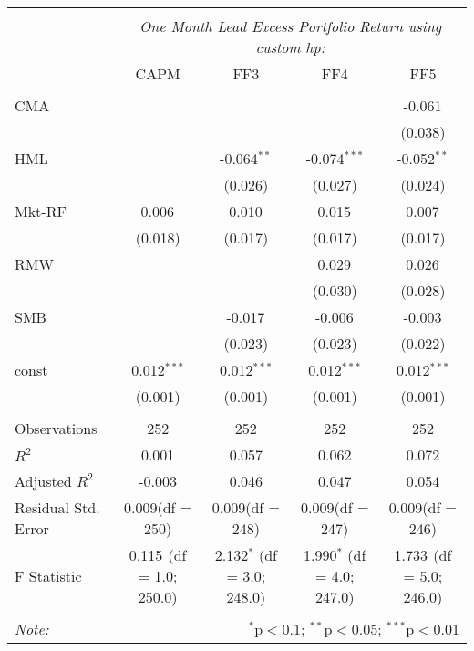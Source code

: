 \begin{table}[!htbp] \centering
\begin{tabular}{@{\extracolsep{5pt}}lcccc}
\\[-1.8ex]\hline
\hline \\[-1.8ex]
& \multicolumn{4}{c}{\textit{One Month Lead Excess Portfolio Return using custom hp:}} \
\cr \cline{4-5}
\\[-1.8ex] & CAPM & FF3 & FF4 & FF5 \\
\hline \\[-1.8ex]
 CMA & & & & -0.061$^{}$ \\
  & & & & (0.038) \\
 HML & & -0.064$^{**}$ & -0.074$^{***}$ & -0.052$^{**}$ \\
  & & (0.026) & (0.027) & (0.024) \\
 Mkt-RF & 0.006$^{}$ & 0.010$^{}$ & 0.015$^{}$ & 0.007$^{}$ \\
  & (0.018) & (0.017) & (0.017) & (0.017) \\
 RMW & & & 0.029$^{}$ & 0.026$^{}$ \\
  & & & (0.030) & (0.028) \\
 SMB & & -0.017$^{}$ & -0.006$^{}$ & -0.003$^{}$ \\
  & & (0.023) & (0.023) & (0.022) \\
 const & 0.012$^{***}$ & 0.012$^{***}$ & 0.012$^{***}$ & 0.012$^{***}$ \\
  & (0.001) & (0.001) & (0.001) & (0.001) \\
\hline \\[-1.8ex]
 Observations & 252 & 252 & 252 & 252 \\
 $R^2$ & 0.001 & 0.057 & 0.062 & 0.072 \\
 Adjusted $R^2$ & -0.003 & 0.046 & 0.047 & 0.054 \\
 Residual Std. Error & 0.009(df = 250) & 0.009(df = 248) & 0.009(df = 247) & 0.009(df = 246)  \\
 F Statistic & 0.115$^{}$ (df = 1.0; 250.0) & 2.132$^{*}$ (df = 3.0; 248.0) & 1.990$^{*}$ (df = 4.0; 247.0) & 1.733$^{}$ (df = 5.0; 246.0) \\
\hline
\hline \\[-1.8ex]
\textit{Note:} & \multicolumn{4}{r}{$^{*}$p$<$0.1; $^{**}$p$<$0.05; $^{***}$p$<$0.01} \\
\end{tabular}
\end{table}
